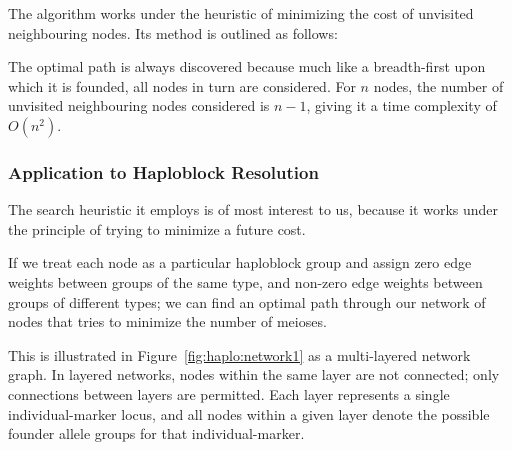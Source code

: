 The algorithm works under the heuristic of minimizing the cost of unvisited neighbouring nodes. Its method is outlined as follows:
\begingroup
\begin{spacing}{1}
\begin{description}

\end{description}
\end{spacing}
\endgroup

The optimal path is always discovered because much like a breadth-first upon which it is founded, all nodes in turn are considered. For $n$ nodes, the number of unvisited neighbouring nodes considered is $n-1$, giving it a time complexity of $O(n^2)$.


\subsubsection{Application to Haploblock Resolution}

The search heuristic it employs is of most interest to us, because it works under the principle of trying to minimize a future cost. 

If we treat each node as a particular haploblock group and assign zero edge weights between groups of the same type, and non-zero edge weights between groups of different types; we can find an optimal path through our network of nodes that tries to minimize the number of meioses.

This is illustrated in Figure~\ref{fig:haplo:network1} as a multi-layered network graph. In layered networks, nodes within the same layer are not connected; only connections between layers are permitted. Each layer represents a single individual-marker locus, and all nodes within a given layer denote the possible founder allele groups for that individual-marker.

